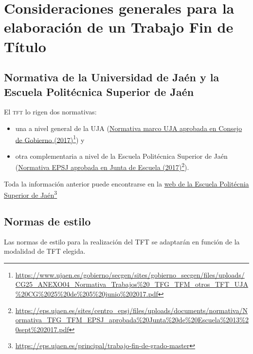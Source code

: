 \chapter[Consideraciones elaboración TFG]{Consideraciones generales para la elaboración de un Trabajo Fin de Título}

\section{Normativa de la Universidad de Jaén y la Escuela Politécnica Superior de Jaén}

El \textsc{tft} lo rigen dos normativas: 
\begin{itemize}
  \item una a nivel general de la UJA (\href{https://www.ujaen.es/gobierno/secgen/sites/gobierno_secgen/files/uploads/CG25_ANEXO04_Normativa_Trabajos\%20_TFG_TFM_otros_TFT_UJA\%20CG\%2025\%20de\%205\%20junio\%202017.pdf}{Normativa marco UJA aprobada en Consejo de Gobierno (2017)}\footnote{\url{https://www.ujaen.es/gobierno/secgen/sites/gobierno_secgen/files/uploads/CG25_ANEXO04_Normativa_Trabajos\%20_TFG_TFM_otros_TFT_UJA\%20CG\%2025\%20de\%205\%20junio\%202017.pdf}}) y 
  \item otra complementaria a nivel de la Escuela Politécnica Superior de Jaén  (\href{https://eps.ujaen.es/sites/centro_epsj/files/uploads/documents/normativa/Normativa_TFG_TFM_EPSJ_aprobada\%20Junta\%20de\%20Escuela\%2013\%20sept\%202017.pdf}{Normativa EPSJ aprobada en Junta de Escuela (2017)}\footnote{\url{https://eps.ujaen.es/sites/centro_epsj/files/uploads/documents/normativa/Normativa_TFG_TFM_EPSJ_aprobada\%20Junta\%20de\%20Escuela\%2013\%20sept\%202017.pdf}}). 
\end{itemize}

Toda la información anterior puede encontrarse en la \href{https://eps.ujaen.es/principal/trabajo-fin-de-grado-master}{web de la Escuela Politécnia Superior de Jaén}\footnote{\url{https://eps.ujaen.es/principal/trabajo-fin-de-grado-master}}

\section{Normas de estilo}
Las normas de estilo para la realización del TFT se adaptarán en función de la modalidad de
TFT elegida.

